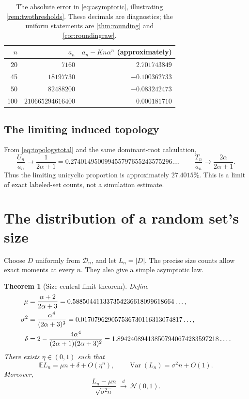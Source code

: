 \documentclass[11pt,letterpaper]{article}
\numberwithin{equation}{section}
\newtheorem{theorem}{Theorem}[section]
\theoremstyle{definition}
\newcommand{\E}{\mathbb E}
\newcommand{\Var}{\operatorname{Var}}
\newcommand{\CM}{\mathcal D}
\newcommand{\1}{\mathbf 1}
\begin{document}
\begin{table}[ht]
\centering
\begin{tabular}{rrr}
\toprule
$n$ & $a_n$ & $a_n-Kn\alpha^n$ (approximately)\\
\midrule
20 & $7160$ & $2.701743849$\\
45 & $18197730$ & $-0.100362733$\\
50 & $82488200$ & $-0.083242473$\\
100 & $210665294616400$ & $0.000181710$\\
\bottomrule
\end{tabular}
\caption{The absolute error in \eqref{eq:asymptotic}, illustrating
\cref{rem:twothresholds}. These decimals are diagnostics; the uniform
statements are \cref{thm:rounding} and \cref{cor:roundingraw}.}
\label{tab:rawerror}
\end{table}

\subsection{The limiting induced topology}
From \eqref{eq:topologytotal} and the same dominant-root calculation,
\begin{equation}\label{eq:typeprob}
 \frac{U_n}{a_n}\longrightarrow
 \frac{1}{2\alpha+1}=0.274014950099455797655243575296\ldots,
 \qquad
 \frac{T_n}{a_n}\longrightarrow\frac{2\alpha}{2\alpha+1}.
\end{equation}
Thus the limiting unicyclic proportion is approximately $27.4015\%$.
This is a limit of exact labeled-set counts, not a simulation estimate.

\section{The distribution of a random set's size}\label{sec:clt}

Choose $D$ uniformly from $\CM_n$, and let $L_n=|D|$. The precise size counts
allow exact moments at every $n$. They also give a simple asymptotic law.

\begin{theorem}[Size central limit theorem]\label{thm:clt}
Define
\begin{align}\label{eq:cltconstants}
 \mu&=\frac{\alpha+2}{2\alpha+3}
      =0.588504411337354236618099618664\ldots,\\
 \sigma^2&=\frac{\alpha^4}{(2\alpha+3)^3}
      =0.017079629057536730116313074817\ldots,\notag\\
 \delta&=2-\frac{4\alpha^4}{(2\alpha+1)(2\alpha+3)^2}
      =1.894240894138507940674283597218\ldots.\notag
\end{align}
There exists $\eta\in(0,1)$ such that
\begin{equation}\label{eq:moments}
 \E L_n=\mu n+\delta+O(\eta^n),\qquad
 \Var(L_n)=\sigma^2n+O(1).
\end{equation}
Moreover,
\begin{equation}\label{eq:clt}
 \frac{L_n-\mu n}{\sqrt{\sigma^2n}}
 \ \xrightarrow{\ d\ }\ \mathcal N(0,1).
\end{equation}
\end{theorem}
\end{document}
